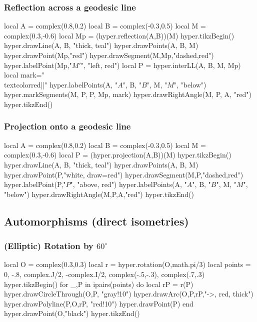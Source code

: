 \documentclass{article}
\begin{document}
\subsubsection{Reflection across a geodesic line}
\begin{codeandresult}
\begin{luacode*}
local A = complex(0.8,0.2)
local B = complex(-0.3,0.5)
local M = complex(0.3,-0.6)
local Mp = (hyper.reflection(A,B))(M)
hyper.tikzBegin()
hyper.drawLine(A, B, "thick, teal")
hyper.drawPoints(A, B, M)
hyper.drawPoint(Mp,"red")
hyper.drawSegment(M,Mp,"dashed,red")
hyper.labelPoint(Mp,"$M'$", "left, red")
local P = hyper.interLL(A, B, M, Mp)
local mark="\\textcolor{red}{||}"
hyper.labelPoints(A, "$A$", B, "$B$", M, "$M$", "below")
hyper.markSegments(M, P, P, Mp, mark)
hyper.drawRightAngle(M, P, A, "red")
hyper.tikzEnd()
\end{luacode*}
\end{codeandresult}

\subsubsection{Projection onto a geodesic line}
\begin{codeandresult}
\begin{luacode*}
local A = complex(0.8,0.2)
local B = complex(-0.3,0.5)
local M = complex(0.3,-0.6)
local P = (hyper.projection(A,B))(M)
hyper.tikzBegin()
hyper.drawLine(A, B, "thick, teal")
hyper.drawPoints(A, B, M)
hyper.drawPoint(P,"white, draw=red")
hyper.drawSegment(M,P,"dashed,red")
hyper.labelPoint(P,"$P$", "above, red")
hyper.labelPoints(A, "$A$", B, "$B$", M, "$M$", "below")
hyper.drawRightAngle(M,P,A,"red")
hyper.tikzEnd()
\end{luacode*}
\end{codeandresult}

\subsection{Automorphisms (direct isometries)}


\subsubsection{(Elliptic) Rotation by $60^\circ$}
\begin{codeandresult}
\begin{luacode*}
local O = complex(0.3,0.3)
local r = hyper.rotation(O,math.pi/3)
local points = {0, -.8, complex.J/2, -complex.I/2, complex(-.5,-.3), complex(.7,.3)}
hyper.tikzBegin()
for _,P in ipairs(points) do
	local rP = r(P)
	hyper.drawCircleThrough(O,P, "gray!10")
	hyper.drawArc(O,P,rP,"->, red, thick")
	hyper.drawPolyline(P,O,rP, "red!10")
	hyper.drawPoint(P)
end
hyper.drawPoint(O,"black")
hyper.tikzEnd()
\end{luacode*}
\end{codeandresult}
\end{document}
